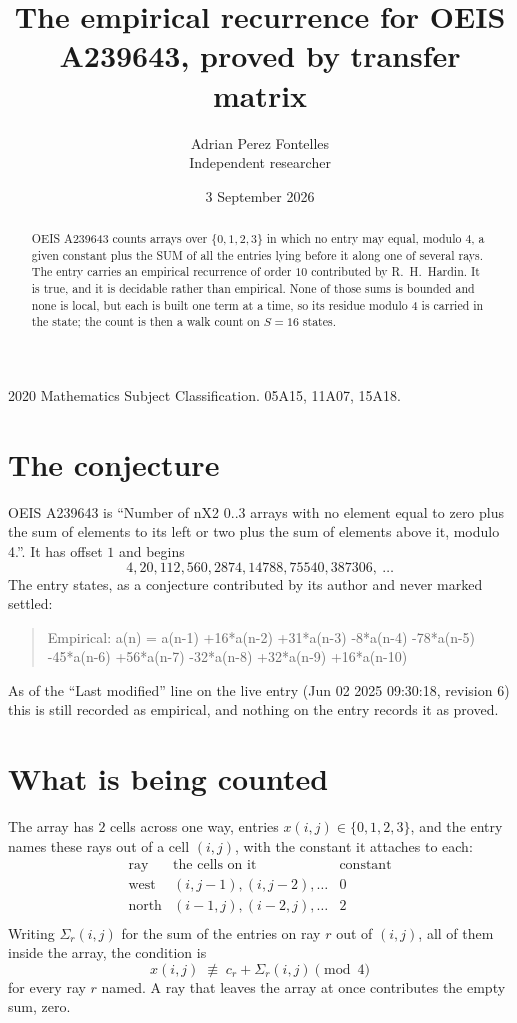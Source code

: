 \documentclass[11pt,a4paper]{article}
\title{The empirical recurrence for OEIS A239643, proved by transfer matrix}
\author{Adrian Perez Fontelles\\ \small Independent researcher}
\date{3 September 2026}
\theoremstyle{plain}
\theoremstyle{definition}
\begin{document}
\maketitle

\begin{abstract}
OEIS A239643 counts arrays over $\{0,1,2,3\}$ in which no entry may equal, modulo $4$, a given
constant plus the SUM of all the entries lying before it along one of several rays. The entry
carries an empirical recurrence of order $10$ contributed by R.~H.~Hardin. It is true, and
it is decidable rather than empirical. None of those sums is bounded and none is local, but
each is built one term at a time, so its residue modulo $4$ is carried in the state; the
count is then a walk count on $S=16$ states.
\end{abstract}

\noindent\small 2020 Mathematics Subject Classification. 05A15, 11A07, 15A18.\normalsize

\section{The conjecture}

OEIS A239643 is ``Number of nX2 0..3 arrays with no element equal to zero plus the sum of elements to its left or two plus the sum of elements above it, modulo 4.''. It has offset $1$ and begins
\[
4, 20, 112, 560, 2874, 14788, 75540, 387306,\ \dots
\]
The entry states, as a conjecture contributed by its author and never marked settled:
\begin{quote}
Empirical: a(n) = a(n-1) +16*a(n-2) +31*a(n-3) -8*a(n-4) -78*a(n-5) -45*a(n-6) +56*a(n-7) -32*a(n-8) +32*a(n-9) +16*a(n-10)
\end{quote}
As of the ``Last modified'' line on the live entry (Jun 02 2025 09:30:18, revision 6) this is still
recorded as empirical, and nothing on the entry records it as proved.

\section{What is being counted}

The array has $2$ cells across one way, entries $x(i,j)\in\{0,1,2,3\}$, and the entry names these
rays out of a cell $(i,j)$, with the constant it attaches to each:
\[
\begin{array}{lll}
\text{ray} & \text{the cells on it} & \text{constant} \\[2pt]
\text{west} & (i,j-1),(i,j-2),\dots & 0 \\
\text{north} & (i-1,j),(i-2,j),\dots & 2 \\
\end{array}
\]
Writing $\Sigma_r(i,j)$ for the sum of the entries on ray $r$ out of $(i,j)$, all of them
inside the array, the condition is
\[
x(i,j)\;\not\equiv\;c_r+\Sigma_r(i,j) \pmod{4}
\]
for every ray $r$ named. A ray that leaves the array at once contributes the empty sum,
zero.
\end{document}
